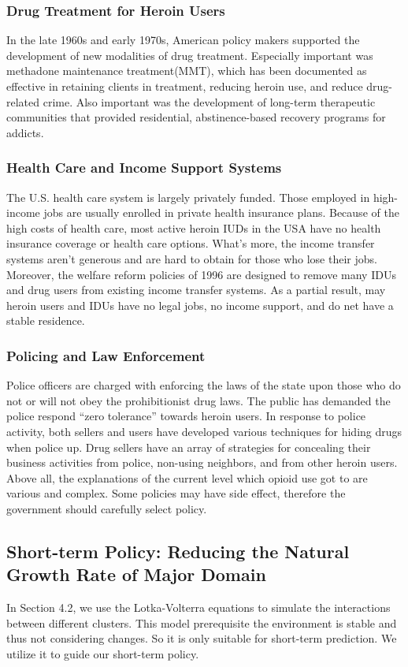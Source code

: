 \documentclass[12pt]{article}
\begin{document}
\subsubsection{Drug Treatment for Heroin Users}
In the late 1960s and early 1970s, American policy makers supported the development of new modalities of drug treatment. Especially important was methadone maintenance treatment(MMT), which has been documented as effective in retaining clients in treatment, reducing heroin use, and reduce drug-related crime. Also important was the development of long-term therapeutic communities that provided residential, abstinence-based recovery programs for addicts.

\subsubsection{Health Care and Income Support Systems}
The U.S. health care system is largely privately funded. Those employed in high-income jobs are usually enrolled in private health insurance plans. Because of the high costs of health care, most active heroin IUDs in the USA have no health insurance coverage or health care options. What’s more, the income transfer systems aren’t generous and are hard to obtain for those who lose their jobs. Moreover, the welfare reform policies of 1996 are designed to remove many IDUs and drug users from existing income transfer systems. As a partial result, may heroin users and IDUs have no legal jobs, no income support, and do net have a stable residence. 

\subsubsection{Policing and Law Enforcement}
Police officers are charged with enforcing the laws of the state upon those who do not or will not obey the prohibitionist drug laws. The public has demanded the police respond “zero tolerance” towards heroin users. In response to police activity, both sellers and users have developed various techniques for hiding drugs when police up. Drug sellers have an array of strategies for concealing their business activities from police, non-using neighbors, and from other heroin users.
Above all, the explanations of the current level which opioid use got to are various and complex. Some policies may have side effect, therefore the government should carefully select policy.

\subsection{Short-term Policy: Reducing the Natural Growth Rate of Major Domain}
In Section 4.2, we use the Lotka-Volterra equations to simulate the interactions between different clusters. This model prerequisite the environment is stable and thus not considering changes. So it is only suitable for short-term prediction. We utilize it to guide our short-term policy.
\end{document}
